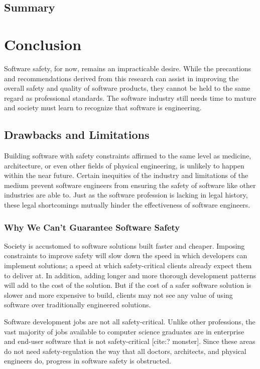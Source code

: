 \documentclass[12pt]{report}
\begin{document}
\section{Summary}

\chapter{Conclusion} 
Software safety, for now, remains an impracticable desire. While the precautions and recommendations derived from this research can assist in improving the overall safety and quality of software products, they cannot be held to the same regard as professional standards. The software industry still needs time to mature and society must learn to recognize that software is engineering. 

\section{Drawbacks and Limitations} 
Building software with safety constraints affirmed to the same level as medicine, architecture, or even other fields of physical engineering, is unlikely to happen within the near future. Certain inequities of the industry and limitations of the medium prevent software engineers from ensuring the safety of software like other industries are able to. 
Just as the software profession is lacking in legal history, these legal shortcomings mutually hinder the effectiveness of software engineers. 

\subsection{Why We Can't Guarantee Software Safety} 
Society is accustomed to software solutions built faster and cheaper. Imposing constraints to improve safety will slow down the speed in which developers can implement solutions; a speed at which safety-critical clients already expect them to deliver at. In addition, adding longer and more thorough development patterns will add to the cost of the solution. But if the cost of a safer software solution is slower and more expensive to build, clients may not see any value of using software over traditionally engineered solutions.

Software development jobs are not all safety-critical. Unlike other professions, the vast majority of jobs available to computer science graduates are in enterprise and end-user software that is not safety-critical [cite:? monster]. Since these areas do not need safety-regulation the way that all doctors, architects, and physical engineers do, progress in software safety is obstructed. 
\end{document}
